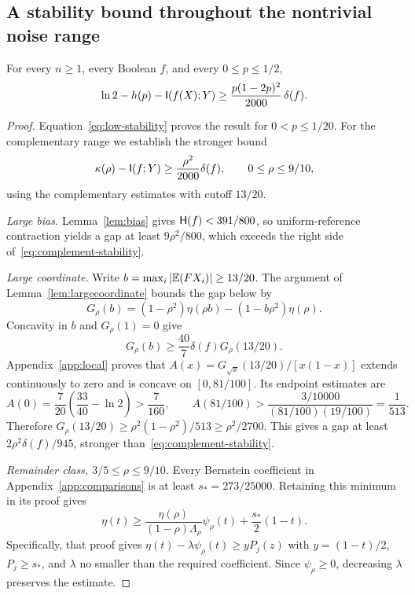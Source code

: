 \subsection{A stability bound throughout the nontrivial noise range}
\begin{theorem}\label{thm:global-stability}
For every $n\ge1$, every Boolean $f$, and every $0\le p\le1/2$,
\begin{equation}\label{eq:global-stability}
\ln2-h(p)-\mathsf I(f(X);Y)
\ge\frac{p(1-2p)^2}{2000}\,\delta(f).
\end{equation}
\end{theorem}
\begin{proof}
Equation~\eqref{eq:low-stability} proves the result for $0<p\le1/20$. For the complementary range we establish the stronger bound
\begin{equation}\label{eq:complement-stability}
\kappa(\rho)-\mathsf I(f;Y)\ge\frac{\rho^2}{2000}\delta(f),
\qquad 0\le\rho\le9/10,
\end{equation}
using the complementary estimates with cutoff $13/20$.

\emph{Large bias.} Lemma~\ref{lem:bias} gives $\mathsf H(f)<391/800$, so uniform-reference contraction yields a gap at least $9\rho^2/800$, which exceeds the right side of~\eqref{eq:complement-stability}.

\emph{Large coordinate.} Write $b=\max_i|\mathbb E(FX_i)|\ge13/20$. The argument of Lemma~\ref{lem:largecoordinate} bounds the gap below by
\[
G_\rho(b)=(1-\rho^2)\eta(\rho b)-(1-b\rho^2)\eta(\rho).
\]
Concavity in $b$ and $G_\rho(1)=0$ give
\[
G_\rho(b)\ge\frac{40}{7}\delta(f)G_\rho(13/20).
\]
Appendix~\ref{app:local} proves that $A(x)=G_{\sqrt{x}}(13/20)/[x(1-x)]$ extends continuously to zero and is concave on $[0,81/100]$. Its endpoint estimates are
\[
A(0)=\frac7{20}\left(\frac{33}{40}-\ln2\right)>\frac7{160},
\qquad A(81/100)>\frac{3/10000}{(81/100)(19/100)}=\frac1{513}.
\]
Therefore $G_\rho(13/20)\ge\rho^2(1-\rho^2)/513\ge\rho^2/2700$. This gives a gap at least $2\rho^2\delta(f)/945$, stronger than~\eqref{eq:complement-stability}.

\emph{Remainder class, $3/5\le\rho\le9/10$.} Every Bernstein coefficient in Appendix~\ref{app:comparisons} is at least $s_*=273/25000$. Retaining this minimum in its proof gives
\begin{equation}\label{eq:strict-comparison}
\eta(t)\ge\frac{\eta(\rho)}{(1-\rho)\Lambda_\rho}\psi_\rho(t)
+\frac{s_*}{2}(1-t).
\end{equation}
Specifically, that proof gives $\eta(t)-\lambda\psi_\rho(t)\ge yP_j(z)$ with $y=(1-t)/2$, $P_j\ge s_*$, and $\lambda$ no smaller than the required coefficient. Since $\psi_\rho\ge0$, decreasing $\lambda$ preserves the estimate.


\end{proof}
